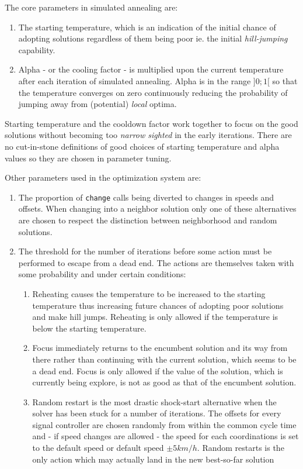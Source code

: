 The core parameters in simulated annealing are:
\begin{enumerate}
\item The starting temperature, which is an indication of the initial chance of adopting solutions regardless of them being poor ie. the initial \textit{hill-jumping} capability.
\item Alpha - or the cooling factor - is multiplied upon the current temperature after each iteration of simulated annealing. Alpha is in the range $]0;1[$ so that the temperature converges on zero continuously reducing the probability of jumping away from (potential) \textit{local} optima.
\end{enumerate}

Starting temperature and the cooldown factor work together to focus on the good solutions without becoming too \textit{narrow sighted} in the early iterations. There are no cut-in-stone definitions of good choices of starting temperature and alpha values so they are chosen in parameter tuning.

Other parameters used in the optimization system are:

\begin{enumerate}
\item The proportion of \verb|change| calls being diverted to changes in speeds and offsets. When changing into a neighbor solution only one of these alternatives are chosen to respect the distinction between neighborhood and random solutions.
\item The threshold for the number of iterations before some action must be performed to escape from a dead end. The actions are themselves taken with some probability and under certain conditions:
\begin{enumerate}
\item Reheating causes the temperature to be increased to the starting temperature thus increasing future chances of adopting poor solutions and make hill jumps. Reheating is only allowed if the temperature is below the starting temperature.
\item Focus immediately returns to the encumbent solution and its way from there rather than continuing with the current solution, which seems to be a dead end. Focus is only allowed if the value of the solution, which is currently being explore, is not as good as that of the encumbent solution.
\item Random restart is the most drastic shock-start alternative when the solver has been stuck for a number of iterations. The offsets for every signal controller are chosen randomly from within the common cycle time and - if speed changes are allowed - the speed for each coordinations is set to the default speed or default speed $\pm 5km/h$. Random restarts is the only action which may actually land in the new best-so-far solution
\end{enumerate}
\end{enumerate}

